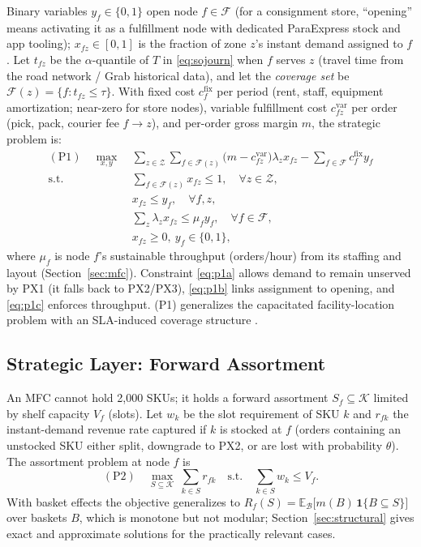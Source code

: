 Binary variables $y_f\in\{0,1\}$ open node $f\in\mathcal{F}$ (for a consignment store, ``opening'' means activating it as a fulfillment node with dedicated ParaExpress stock and app tooling); $x_{fz}\in[0,1]$ is the fraction of zone $z$'s instant demand assigned to $f$. Let $t_{fz}$ be the $\alpha$-quantile of $T$ in \eqref{eq:sojourn} when $f$ serves $z$ (travel time from the road network / Grab historical data), and let the \emph{coverage set} be $\mathcal{F}(z)=\{f: t_{fz}\le\tau\}$. With fixed cost $c^{\mathrm{fix}}_f$ per period (rent, staff, equipment amortization; near-zero for store nodes), variable fulfillment cost $c^{\mathrm{var}}_{fz}$ per order (pick, pack, courier fee $f\to z$), and per-order gross margin $m$, the strategic problem is:
\begin{align}
(\mathrm{P1})\quad \max_{x,y}\ &\sum_{z\in\mathcal{Z}}\sum_{f\in\mathcal{F}(z)}\bigl(m-c^{\mathrm{var}}_{fz}\bigr)\lambda_z x_{fz}-\sum_{f\in\mathcal{F}}c^{\mathrm{fix}}_f y_f \label{eq:p1}\\
\text{s.t.}\ &\textstyle\sum_{f\in\mathcal{F}(z)}x_{fz}\le 1,\quad \forall z\in\mathcal{Z},\label{eq:p1a}\\
&x_{fz}\le y_f,\quad \forall f,z,\label{eq:p1b}\\
&\textstyle\sum_z\lambda_zx_{fz}\le\mu_fy_f,\quad\forall f\in\mathcal{F},\label{eq:p1c}\\
&x_{fz}\ge 0,\ y_f\in\{0,1\},\nonumber
\end{align}
where $\mu_f$ is node $f$'s sustainable throughput (orders/hour) from its staffing and layout (Section~\ref{sec:mfc}). Constraint \eqref{eq:p1a} allows demand to remain unserved by PX1 (it falls back to PX2/PX3), \eqref{eq:p1b} links assignment to opening, and \eqref{eq:p1c} enforces throughput. (P1) generalizes the capacitated facility-location problem \cite{daskin2013,melo2009} with an SLA-induced coverage structure \cite{church1974}.

\subsection{Strategic Layer: Forward Assortment}

An MFC cannot hold 2,000 SKUs; it holds a forward assortment $S_f\subseteq\mathcal{K}$ limited by shelf capacity $V_f$ (slots). Let $w_k$ be the slot requirement of SKU $k$ and $r_{fk}$ the instant-demand revenue rate captured if $k$ is stocked at $f$ (orders containing an unstocked SKU either split, downgrade to PX2, or are lost with probability $\theta$). The assortment problem at node $f$ is
\begin{equation}\label{eq:p2}
(\mathrm{P2})\quad \max_{S\subseteq\mathcal{K}}\ \sum_{k\in S}r_{fk}\quad\text{s.t.}\quad\sum_{k\in S}w_k\le V_f.
\end{equation}
With basket effects the objective generalizes to $R_f(S)=\mathbb{E}_{\mathcal{B}}\bigl[m(B)\,\mathbf{1}\{B\subseteq S\}\bigr]$ over baskets $B$, which is monotone but not modular; Section~\ref{sec:structural} gives exact and approximate solutions for the practically relevant cases.

